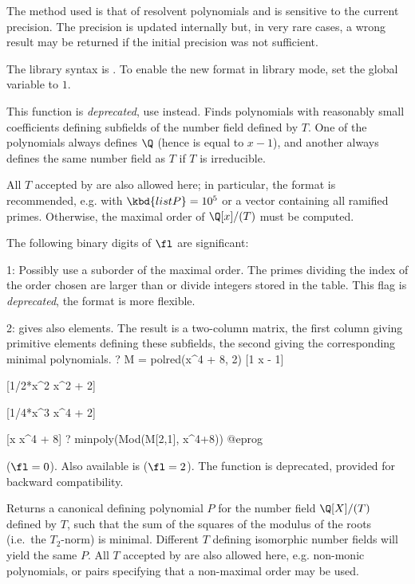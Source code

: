  The method used is that of resolvent polynomials and is
sensitive to the current precision. The precision is updated internally but,
in very rare cases, a wrong result may be returned if the initial precision
was not sufficient.

The library syntax is .
To enable the new format in library mode,
set the global variable  to $1$.

\label{se:polred}
This function is \emph{deprecated}, use  instead.
Finds polynomials with reasonably small coefficients defining subfields of
the number field defined by $T$. One of the polynomials always defines $\Q$
(hence is equal to $x-1$), and another always defines the same number field
as $T$ if $T$ is irreducible.

All $T$ accepted by  are also allowed here;
in particular, the format \kbd{[T, listP]} is recommended, e.g. with
$\kbd{listP} = 10^5$ or a vector containing all ramified primes. Otherwise,
the maximal order of $\Q[x]/(T)$ must be computed.

The following binary digits of $\fl$ are significant:

1: Possibly use a suborder of the maximal order. The
primes dividing the index of the order chosen are larger than
 or divide integers stored in the  table.
This flag is \emph{deprecated}, the \kbd{[T, listP]} format is more
flexible.

2: gives also elements. The result is a two-column matrix, the first column
giving primitive elements defining these subfields, the second giving the
corresponding minimal polynomials.
\bprog
? M = polred(x^4 + 8, 2)
[1 x - 1]

[1/2*x^2 x^2 + 2]

[1/4*x^3 x^4 + 2]

[x x^4 + 8]
? minpoly(Mod(M[2,1], x^4+8))
@eprog

 ($\fl = 0$). Also available is
 ($\fl = 2$). The function  is
deprecated, provided for backward compatibility.

\label{se:polredabs}
Returns a canonical defining polynomial $P$ for the number field
$\Q[X]/(T)$ defined by $T$, such that the sum of the squares of the modulus
of the roots (i.e.~the $T_2$-norm) is minimal. Different $T$ defining
isomorphic number fields will yield the same $P$. All $T$ accepted by
 are also allowed here, e.g. non-monic polynomials, or pairs
\kbd{[T, listP]} specifying that a non-maximal order may be used.

